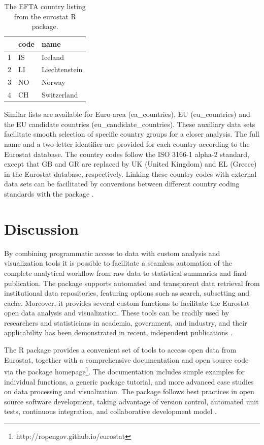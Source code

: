 \begin{table}[h]
\centering
\begin{tabular}{rll}
\toprule
  \hline
  & code & name \\ 
  \hline
  1 & IS & Iceland \\ 
  2 & LI & Liechtenstein \\ 
  3 & NO & Norway \\ 
  4 & CH & Switzerland \\ 
   \hline
\bottomrule   
\end{tabular}
\caption{The EFTA country listing from the eurostat R package.}
\label{tab:efta}
\end{table}

Similar lists are available for Euro area (ea\_countries), EU
(eu\_countries) and the EU candidate countries
(eu\_candidate\_countries). These auxiliary data sets facilitate
smooth selection of specific country groups for a closer analysis. The
full name and a two-letter identifier are provided for each country
according to the Eurostat database. The country codes follow the ISO
3166-1 alpha-2 standard, except that GB and GR are replaced by UK
(United Kingdom) and EL (Greece) in the Eurostat database,
respectively. Linking these country codes with external data sets can
be facilitated by conversions between different country coding
standards with the  package \citep{countrycode}.




\section{Discussion}

By combining programmatic access to data with custom analysis and visualization tools it is possible to facilitate a seamless automation of the complete analytical workflow from raw data to statistical summaries and final publication. The package supports automated and transparent data retrieval from institutional data repositories, featuring options such as search, subsetting and cache. Moreover, it provides several custom functions to facilitate the Eurostat open data analysis and visualization. These tools can be readily used by researchers and statisticians in academia, government, and industry, and their applicability has been demonstrated in recent, independent publications \citep{Kenett2016}. 

The  R package provides a convenient set of tools to access open data from Eurostat, together with a comprehensive documentation and open source code via the package homepage\footnote{http://ropengov.github.io/eurostat}. The documentation includes simple examples for individual functions, a generic package tutorial, and more advanced case studies on data processing and visualization. The package follows best practices in open source software development, taking advantage of version control, automated unit tests, continuous integration, and collaborative development model \citep{PerezRiverol2016}.

